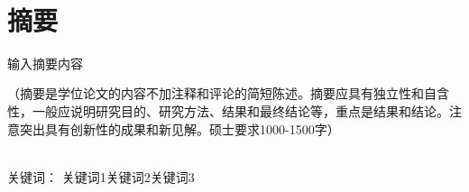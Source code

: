 \newpage





\setcounter{secnumdepth}{0}
\setcounter{page}{1}

\hei{}\noindent\begin{center}
    \\
\end{center}

\section{\hei{}摘\quad 要}
{
    \fsong{}
        输入摘要内容
        
        （摘要是学位论文的内容不加注释和评论的简短陈述。摘要应具有独立性和自含性，一般应说明研究目的、研究方法、结果和最终结论等，重点是结果和结论。注意突出具有创新性的成果和新见解。硕士要求1000-1500字）

        ~\\
    
    \hei{}\noindent
        关键词：
    \fsong{}
        关键词1\quad 关键词2\quad 关键词3

}
\thispagestyle{empty}
\newpage

